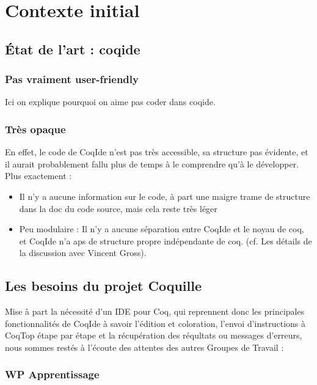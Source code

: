 \section{Contexte initial}

    \subsection{État de l'art : coqide}

        \subsubsection{Pas vraiment user-friendly}

            Ici on explique pourquoi on aime pas coder dans coqide.
			
        \subsubsection{Très opaque}

		En effet, le code de CoqIde n'est pas très accessible, sa structure pas évidente, et il aurait probablement fallu plus de temps à le comprendre qu'à le développer. Plus exactement :
		\begin{itemize}
			\item Il n'y a aucune information sur le code, à part une maigre trame de structure dans la doc du code source, mais cela reste très léger
			\item Peu modulaire : Il n'y a aucune séparation entre CoqIde et le noyau de coq, et CoqIde n'a aps de structure propre indépendante de coq. (cf. Les détails de la discussion avec Vincent Gross).	
		\end{itemize}
		
	\subsection{Les besoins du projet Coquille}

		Mise à part la nécessité d'un IDE pour Coq, qui reprennent donc les principales fonctionnalités de CoqIde à savoir l'édition et coloration, l'envoi d'instructions à CoqTop étape par étape et la récupération des réqultats ou messages d'erreurs, nous sommes restés à l'écoute des attentes des autres Groupes de Travail :
        
        \subsubsection{WP Apprentissage}

